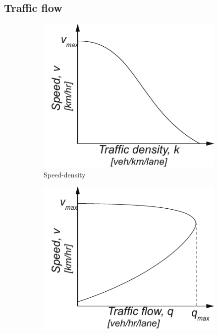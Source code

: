 \documentclass{article}
\begin{document}
\subsection{Traffic flow}
\begin{figure}[ht!]
	\hfill
	\centering
	\begin{subfigure}[h]{0.25\linewidth}
		\centering
		\includegraphics[width=\textwidth]{figures/speeddensity}
		\caption{Speed-density}
		\label{fig:speeddensity}
	\end{subfigure}
	\hfill
	\begin{subfigure}[h]{0.25\linewidth}
		\centering
		\includegraphics[width=\textwidth]{figures/speedflow}

\end{subfigure}
\end{figure}
\end{document}
